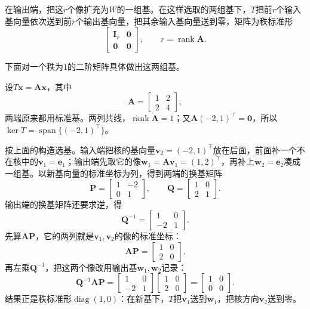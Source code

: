 在输出端，把这$r$个像扩充为$W$的一组基。在这样选取的两组基下，$T$把前$r$个输入基向量依次送到前$r$个输出基向量，把其余输入基向量送到零，矩阵为秩标准形
\begin{equation}
 \begin{bmatrix}\bm I_r&\bm0\\\bm0&\bm0\end{bmatrix},\qquad r=\operatorname{rank}\bm A.
\label{eq:ls-rank-normal-form}
\end{equation}

下面对一个秩为$1$的二阶矩阵具体做出这两组基。
\begin{example}[两端各自选基化为秩标准形]
\label{ex:ls-rank-normal-form-two-by-two}
设$T\bm x=\bm A\bm x$，其中
\[
 \bm A=\begin{bmatrix}1&2\\2&4\end{bmatrix},
\]
两端原来都用标准基。两列共线，$\operatorname{rank}\bm A=1$；又$\bm A(-2,1)^\top=\bm0$，所以$\ker T=\operatorname{span}\{(-2,1)^\top\}$。

按上面的构造选基。输入端把核的基向量$\bm v_2=(-2,1)^{\top}$放在后面，前面补一个不在核中的$\bm v_1=\bm e_1$；输出端先取它的像$\bm w_1=\bm A\bm v_1=(1,2)^{\top}$，再补上$\bm w_2=\bm e_2$凑成一组基。以新基向量的标准坐标为列，得到两端的换基矩阵
\[
 \bm P=\begin{bmatrix}1&-2\\0&1\end{bmatrix},\qquad
 \bm Q=\begin{bmatrix}1&0\\2&1\end{bmatrix}.
\]
输出端的换基矩阵还要求逆，得
\[
 \bm Q^{-1}=\begin{bmatrix}1&0\\-2&1\end{bmatrix}.
\]
先算$\bm A\bm P$，它的两列就是$\bm v_1,\bm v_2$的像的标准坐标：
\[
 \bm A\bm P=\begin{bmatrix}1&0\\2&0\end{bmatrix}.
\]
再左乘$\bm Q^{-1}$，把这两个像改用输出基$\bm w_1,\bm w_2$记录：
\[
 \bm Q^{-1}\bm A\bm P=\begin{bmatrix}1&0\\-2&1\end{bmatrix}\begin{bmatrix}1&0\\2&0\end{bmatrix}
 =\begin{bmatrix}1&0\\0&0\end{bmatrix}.
\]
结果正是秩标准形$\operatorname{diag}(1,0)$：在新基下，$T$把$\bm v_1$送到$\bm w_1$，把核方向$\bm v_2$送到零。
\end{example}
